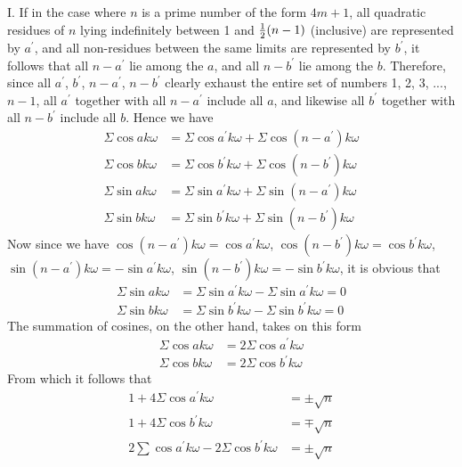\documentclass[twoside,12pt, showframe]{memoir}
\let\oldfrac\frac
\def\frac#1#2{\mathchoice{\tfrac{#1}{#2}}{\oldfrac{#1}{#2}}{\genfrac{}{}{}{2}{#1}{#2\mathstrut}}{\genfrac{}{}{}{3}{#1}{#2\mathstrut}}}
\begin{document}
I. If in the case where \(n\) is a prime number of the form \(4m+1\), all quadratic residues of \(n\) lying indefinitely between 1 and \(\frac{1}{2}(n-1)\) (inclusive) are represented by \(a^{\prime}\), and all non-residues between the same limits are represented by \(b^{\prime}\), it follows that all \(n-a^{\prime}\) lie among the \(a\), and all \(n-b^{\prime}\) lie among the \(b\). Therefore, since all \(a^{\prime}\), \(b^{\prime}\), \(n-a^{\prime}\), \(n-b^{\prime}\) clearly exhaust the entire set of numbers 1, 2, 3, ..., \(n-1\), all \(a^{\prime}\) together with all \(n-a^{\prime}\) include all \(a\), and likewise all \(b^{\prime}\) together with all \(n-b^{\prime}\) include all \(b\). Hence we have\clearpage\noindent%
\[\begin{aligned}
\Sigma \cos ak\omega &= \Sigma \cos a^{\prime}k\omega + \Sigma \cos (n-a^{\prime})k\omega \\
\Sigma \cos bk\omega &= \Sigma \cos b^{\prime}k\omega + \Sigma \cos (n-b^{\prime})k\omega \\
\Sigma \sin ak\omega &= \Sigma \sin a^{\prime}k\omega + \Sigma \sin (n-a^{\prime})k\omega \\
\Sigma \sin bk\omega &= \Sigma \sin b^{\prime}k\omega + \Sigma \sin (n-b^{\prime})k\omega
\end{aligned}\]
Now since we have \(\cos (n-a^{\prime})k\omega = \cos a^{\prime}k\omega\), \(\cos (n-b^{\prime})k\omega = \cos b^{\prime}k\omega\), \(\sin (n-a^{\prime})k\omega = -\sin a^{\prime}k\omega\), \(\sin (n-b^{\prime})k\omega = -\sin b^{\prime}k\omega\), it is obvious that
\[\begin{aligned}
\Sigma \sin ak\omega &= \Sigma \sin a^{\prime}k\omega - \Sigma \sin a^{\prime}k\omega = 0 \\
\Sigma \sin bk\omega &= \Sigma \sin b^{\prime}k\omega - \Sigma \sin b^{\prime}k\omega = 0
\end{aligned}\]
The summation of cosines, on the other hand, takes on this form
\[\begin{aligned}
\Sigma \cos ak\omega &= 2 \Sigma \cos a^{\prime}k\omega \\
\Sigma \cos bk\omega &= 2 \Sigma \cos b^{\prime}k\omega
\end{aligned}\]
From which it follows that
\[\begin{aligned}
1 + 4\Sigma \cos a^{\prime}k\omega &= \pm \sqrt{n} \\
1 + 4\Sigma \cos b^{\prime}k\omega &= \mp \sqrt{n} \\
2 \sum \cos a^{\prime}k\omega - 2 \Sigma \cos b^{\prime}k\omega &= \pm \sqrt{n}
\end{aligned}\]
%
\end{document}
